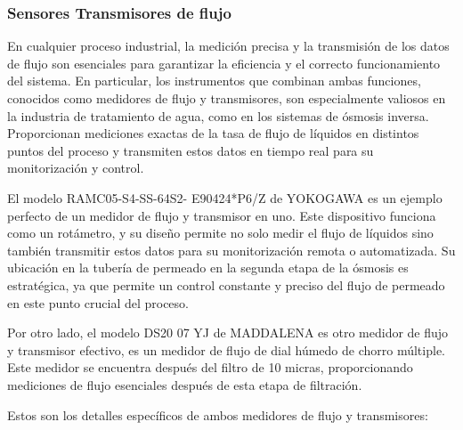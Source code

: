 \subsubsection{Sensores Transmisores de flujo} \label{sec:sensor_flujo}

En cualquier proceso industrial, la medición precisa y la transmisión de los datos de flujo son esenciales para
garantizar la eficiencia y el correcto funcionamiento del sistema. En particular, los instrumentos que combinan
ambas funciones, conocidos como medidores de flujo y transmisores, son especialmente valiosos en la industria de
tratamiento de agua, como en los sistemas de ósmosis inversa. Proporcionan mediciones exactas de la tasa de flujo de
líquidos en distintos puntos del proceso y transmiten estos datos en tiempo real para su monitorización y control.

El modelo RAMC05-S4-SS-64S2- E90424*P6/Z de YOKOGAWA es un ejemplo perfecto de un medidor de flujo y transmisor en uno.
Este dispositivo funciona como un rotámetro, y su diseño permite no solo medir el flujo de líquidos sino también transmitir
estos datos para su monitorización remota o automatizada. Su ubicación en la tubería de permeado en la segunda etapa de la
ósmosis es estratégica, ya que permite un control constante y preciso del flujo de permeado en este punto crucial del proceso.

Por otro lado, el modelo DS20 07 YJ de MADDALENA es otro medidor de flujo y transmisor efectivo,  es un medidor de flujo de dial húmedo de chorro múltiple.
Este medidor se encuentra después del
filtro de 10 micras, proporcionando mediciones de flujo esenciales después de esta etapa de filtración.



Estos son los detalles específicos de ambos medidores de flujo y transmisores:\\



